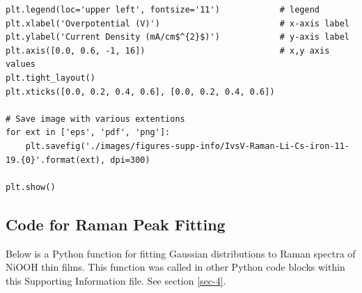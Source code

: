 \documentclass[journal=jpccck,manuscript=suppinfo,email=true]{achemso}
\begin{document}
\begin{verbatim}
plt.legend(loc='upper left', fontsize='11')            # legend
plt.xlabel('Overpotential (V)')                        # x-axis label
plt.ylabel('Current Density (mA/cm$^{2}$)')            # y-axis label
plt.axis([0.0, 0.6, -1, 16])                           # x,y axis values
plt.tight_layout()
plt.xticks([0.0, 0.2, 0.4, 0.6], [0.0, 0.2, 0.4, 0.6])

# Save image with various extentions
for ext in ['eps', 'pdf', 'png']:
    plt.savefig('./images/figures-supp-info/IvsV-Raman-Li-Cs-iron-11-19.{0}'.format(ext), dpi=300)

plt.show()
\end{verbatim}

\subsection{Code for Raman Peak Fitting}
\label{sec-6-2}
Below is a Python function for fitting Gaussian distributions to Raman spectra of NiOOH thin films. This function was called in other Python code blocks within this Supporting Information file. See section \ref{sec-4}.
\end{document}
